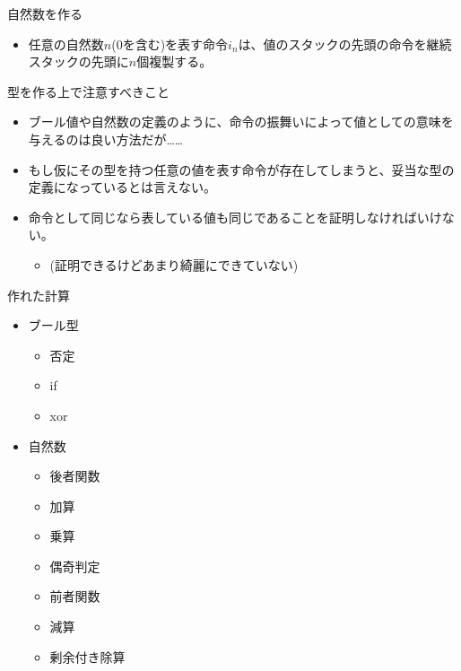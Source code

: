 \documentclass[cjk, 14pt, dvipdfm]{beamer}
\begin{document}
\begin{frame}{自然数を作る}

  \begin{itemize}
    \item 任意の自然数$n$(0を含む)を表す命令$i_n$は、値のスタックの先頭の命令を継続スタックの先頭に$n$個複製する。
  \end{itemize}

\end{frame}

\begin{frame}{型を作る上で注意すべきこと}

  \begin{itemize}
    \item ブール値や自然数の定義のように、命令の振舞いによって値としての意味を与えるのは良い方法だが……
    \item もし仮にその型を持つ任意の値を表す命令が存在してしまうと、妥当な型の定義になっているとは言えない。
    \item 命令として同じなら表している値も同じであることを証明しなければいけない。
    \begin{itemize}
      \item (証明できるけどあまり綺麗にできていない)
    \end{itemize}
  \end{itemize}

\end{frame}

\begin{frame}{作れた計算}

  \begin{itemize}
    \item ブール型
    \begin{itemize}
      \item 否定
      \item if
      \item xor
    \end{itemize}
    \item 自然数
    \begin{itemize}
      \item 後者関数
      \item 加算
      \item 乗算
      \item 偶奇判定
      \item 前者関数
      \item 減算
      \item 剰余付き除算
    \end{itemize}
  \end{itemize}

\end{frame}
\end{document}
